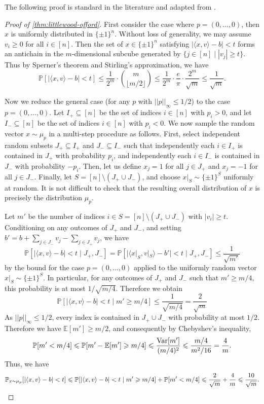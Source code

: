 \documentclass[reqno]{amsart}
\theoremstyle{remark}
\theoremstyle{definition}
\numberwithin{theorem}{section}
\renewcommand{\(}{\bigl(}
\renewcommand{\)}{\bigr)\vphantom{)}}
\newcommand{\E}{\mathbb{E}}
\renewcommand{\le}{\leqslant}
\renewcommand{\ge}{\geqslant}
\renewcommand{\P}{\mathbb{P}}
\newcommand{\floor}[1]{\lfloor#1\rfloor}
\newcommand{\ang}[1]{\langle#1\rangle}
\newcommand{\bin}{\{\pm 1\}}
\newcommand{\var}{\textup{Var}}
\begin{document}
The following proof is standard in the literature and adapted from \cite{klein2022slicing}.

\begin{proof}[Proof of \cref{thm:littlewood-offord}]
    First consider the case where $p = (0,\dots, 0)$, then $x$ is uniformly distributed in $\bin^n$. Without loss of generality, we may assume $v_i\ge 0$ for all $i \in [n]$. Then the set of $x\in \bin^n$ satisfying $|\ang{x,v} - b| < t$ forms an antichain in the $m$-dimensional subcube generated by $\{j\in [n] \mid |v_j|\ge t\}$. Thus by Sperner's theorem and Stirling's approximation, we have
    \[\P[|\ang{x,v} - b| < t] \le \frac{1}{2^m}\cdot\binom{m}{\floor{m/2}} \le  \frac{1}{2^m}\cdot\frac{e}{\pi}\cdot\frac{2^m}{\sqrt{m}}\le \frac{1}{\sqrt{m}}.\]

    Now we reduce the general case (for any $p$ with $||p||_\infty \le 1/2$) to the case $p = (0,\dots, 0)$. Let $I_+\subseteq [n]$ be the set of indices $i\in [n]$ with $p_i>0$, and let $I_-\subseteq [n]$ be the set of indices $i\in [n]$ with $p_i<0$. We now sample the random vector $x\sim \mu_p$ in a multi-step procedure as follows. First, select independent random subsets $J_+\subseteq I_+$ and $J_-\subseteq I_-$ such that independently each $i\in I_+$ is contained in $J_+$ with probability $p_i$, and independently each $i\in I_-$ is contained in $J_-$ with probability $-p_i$. Then, let us define $x_j=1$ for all $j\in J_+$ and $x_j=-1$ for all $j\in J_-$. Finally, let $S=[n]\setminus (J_+\cup J_-)$, and choose $x|_{S}\sim \bin^{S}$ uniformly at random. It is not difficult to check that the resulting overall distribution of $x$ is precisely the distribution $\mu_p$.

    Let $m'$ be the number of indices $i\in S=[n]\setminus (J_+\cup J_-)$ with $|v_i|\ge t$. Conditioning on any outcomes of $J_+$ and $J_-$, and setting $b'=b+\sum_{j\in J_-}v_j-\sum_{j\in J_+}v_j$, we have
    \[\P[|\ang{x,v} - b| < t\mid J_+,J_-]=\P[|\ang{x|_S,v|_S} - b'| < t\mid J_+,J_-]\le \frac{1}{\sqrt{m'}}\]
    by the bound for the case $p = (0,\dots, 0)$ applied to the uniformly random vector $x|_{S}\sim \bin^{S}$. In particular, for any outcomes of $J_+$ and $J_-$ such that $m'\ge m/4$, this probability is at most $1/\sqrt{m/4}$. Therefore we obtain
    \[\P[|\ang{x,v} - b| < t\mid m'\ge m/4]\le \frac{1}{\sqrt{m/4}}=\frac{2}{\sqrt{m}}\]
     As $||p||_\infty \le 1/2$, every index is contained in $J_+\cup J_-$ with probability at most $1/2$. Therefore we have $\E[m']\ge m/2$, and consequently by Chebyshev's inequality,
    \[\P[m' < m/4]\le \P[m'-\E[m'] \ge m/4]\le \frac{\var[m']}{(m/4)^2}\le \frac{m/4}{m^2/16}= \frac{4}{m}.\]
    Thus, we have
    \[\P_{x\sim \mu_p}[|\ang{x,v} - b| < t] \le \P[|\ang{x,v} - b| < t\mid m'\ge m/4]+\P[m' < m/4]\le \frac{2}{\sqrt{m}}+\frac{4}{m}\le \frac{10}{\sqrt{m}}.\qedhere\]  
\end{proof}
\end{document}
